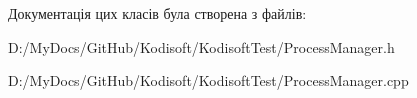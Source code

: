 Документація цих класів була створена з файлів\+:\begin{DoxyCompactItemize}
\item 
D\+:/\+My\+Docs/\+Git\+Hub/\+Kodisoft/\+Kodisoft\+Test/Process\+Manager.\+h\item 
D\+:/\+My\+Docs/\+Git\+Hub/\+Kodisoft/\+Kodisoft\+Test/Process\+Manager.\+cpp\end{DoxyCompactItemize}
